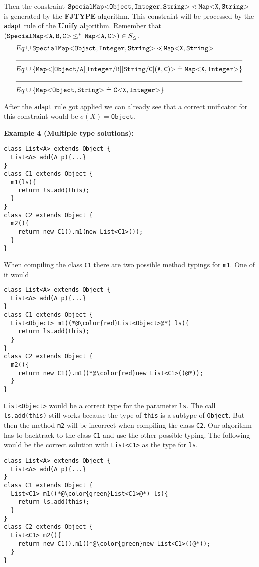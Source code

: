 \documentclass[runningheads]{llncs}
\begin{document}
Then the constraint $\mathtt{SpecialMap {\tt <} Object,Integer,String {\tt >} } \lessdot \mathtt{Map {\tt <} X,String {\tt >} }$
is generated by the \textbf{FJTYPE} algorithm.
This constraint will be processed by the \texttt{adapt} rule of the \textbf{Unify} algorithm.
Remember that $(\mathtt{SpecialMap {\tt <} A,B,C {\tt >} } \textrm{$\, \leq^\ast \,$}\  \mathtt{Map {\tt <} A,C {\tt >} }) \in S_\leq$.
\begin{align*}
  Eq& \cup \exptype{SpecialMap}{Object,Integer,String} \lessdot \exptype{Map}{X,String} \\
  \cline{1-2} 
  Eq& \cup \set{\exptype{Map}{[ Object / A ][ Integer / B ][ String / C ](A,C)}
  \doteq \exptype{Map}{X,Integer}} \\
  \cline{1-2} 
  Eq& \cup \set{\exptype{Map}{Object,String}
  \doteq \exptype{C}{X, Integer}}
\end{align*}

After the \texttt{adapt} rule got applied we can already see that a correct unificator for this constraint would be
$\sigma(X) = \texttt{Object}$.

\textbf{Example 4 (Multiple type solutions):}
\begin{lstlisting}
class List<A> extends Object {
  List<A> add(A p){...}
}
class C1 extends Object {
  m1(ls){
    return ls.add(this);
  }
}
class C2 extends Object {
  m2(){
    return new C1().m1(new List<C1>());
  }
}
\end{lstlisting}
When compiling the class \texttt{C1} there are two possible method typings for \texttt{m1}.
One of it would 
\begin{lstlisting}
class List<A> extends Object {
  List<A> add(A p){...}
}
class C1 extends Object {
  List<Object> m1((*@\color{red}List<Object>@*) ls){
    return ls.add(this);
  }
}
class C2 extends Object {
  m2(){
    return new C1().m1((*@\color{red}new List<C1>()@*));
  }
}
\end{lstlisting}
\texttt{List<Object>} would be a correct type for the parameter \texttt{ls}.
The call \texttt{ls.add(this)} still works because the type of \texttt{this} is a subtype of \texttt{Object}.
But then the method \texttt{m2} will be incorrect when compiling the class \texttt{C2}.
Our algorithm has to backtrack to the class \texttt{C1} and use the other possible typing.
The following would be the correct solution with \texttt{List<C1>} as the type for \texttt{ls}.
\begin{lstlisting}
class List<A> extends Object {
  List<A> add(A p){...}
}
class C1 extends Object {
  List<C1> m1((*@\color{green}List<C1>@*) ls){
    return ls.add(this);
  }
}
class C2 extends Object {
  List<C1> m2(){
    return new C1().m1((*@\color{green}new List<C1>()@*));
  }
}
\end{lstlisting}
\end{document}
